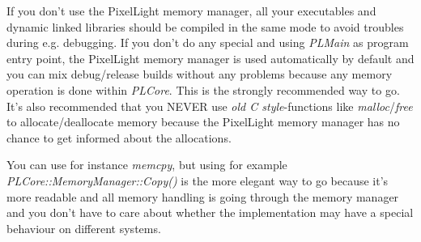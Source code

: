 If you don't use the PixelLight memory manager, all your executables and dynamic linked libraries should be compiled in the same mode to avoid troubles during e.g. debugging. If you don't do any special and using \emph{PLMain} as program entry point, the PixelLight memory manager is used automatically by default and you can mix debug/release builds without any problems because any memory operation is done within \emph{PLCore}. This is the strongly recommended way to go. It's also recommended that you NEVER use \emph{old C style}-functions like \emph{malloc}/\emph{free} to allocate/deallocate memory because the PixelLight memory manager has no chance to get informed about the allocations.

You can use for instance \emph{memcpy}, but using for example \emph{PLCore::MemoryManager::Copy()} is the more elegant way to go because it's more readable and all memory handling is going through the memory manager and you don't have to care about whether the implementation may have a special behaviour on different systems.
